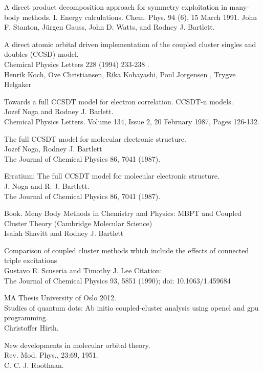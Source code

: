 \documentclass[a4paper,norsk,11pt,twoside]{report}
\begin{document}
\begin{thebibliography}{}
A direct product decomposition approach for symmetry exploitation in many-body methods. I. Energy calculations.
Chem. Phys. 94 (6), 15 March 1991.
John F. Stanton, J\"urgen Gauss, John D. Watts, and Rodney J. Bartlett.

A direct atomic orbital driven implementation of the coupled cluster singles and doubles (CCSD) model. \\
Chemical Physics Letters 228 (1994) 233-238 . \\
Henrik Koch, Ove Christiansen, Rika Kobayashi, Poul Jorgensen , Trygve Helgaker

Towards a full CCSDT model for electron correlation. CCSDT-n models. \\
Jozef Noga and Rodney J. Barlett. \\
Chemical Physics Letters. Volume 134, Issue 2, 20 February 1987, Pages 126-132.


The full CCSDT model for molecular electronic structure. \\
Jozef Noga, Rodney J. Bartlett \\
The Journal of Chemical Physics 86, 7041 (1987).

Erratium: The full CCSDT model for molecular electronic structure. \\
J. Noga and R. J. Bartlett. \\
The Journal of Chemical Physics 86, 7041 (1987).

Book. Meny Body Methods in Chemistry and Physics: MBPT and Coupled Cluster Theory (Cambridge Molecular Science) \\
Isaiah Shavitt and Rodney J. Bartlett

Comparison of coupled cluster methods which include the effects of connected triple
excitations \\
Gustavo E. Scuseria and Timothy J. Lee
Citation: \\
The Journal of Chemical Physics 93, 5851 (1990); doi: 10.1063/1.459684

MA Thesis University of Oslo 2012. \\
Studies of quantum dots: Ab initio coupled-cluster analysis using opencl and gpu programming.  \\
Christoffer Hirth.

New developments in molecular orbital theory. \\
Rev. Mod. Phys., 23:69, 1951. \\
C. C. J. Roothaan.


\end{thebibliography}
\end{document}

